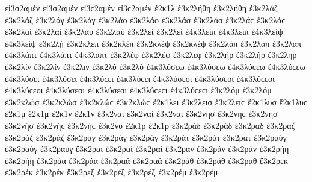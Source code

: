 {εἰ3σ2αμέν εἰ3σ2αμέν εἰ3ϲ2αμέν εἰ3ϲ2αμέν
%
ἐ2κ1λ   %
ἐ3κ2λήθη ἐ3κ2λήθη   %
ἐ3κ2λάζ ἐ3κ2λάζ   %
ἐ3κ2λάγ ἐ3κ2λάγ   %
ἐ3κ2λάο ἐ3κ2λάο   %
ἐ3κ2λάσ ἐ3κ2λάσ ἐ3κ2λάϲ ἐ3κ2λάϲ   %
ἐ3κ2λαί ἐ3κ2λαί   %
ἐ3κ2λαύ ἐ3κ2λαύ   %
ἐ3κ2λεί ἐ3κ2λεί   %
ἐ4κ3λείπ ἐ4κ3λείπ   %
ἐ4κ3λείψ ἐ4κ3λείψ   %
ἐ3κ2λῄ   %
ἐ3κ2κλέπ ἐ3κ2κλέπ   %
ἐ3κ2κλέψ ἐ3κ2κλέψ   %
ἐ3κ2λάπ ἐ3κ2λάπ   %
ἐ3κ2λαπ   %
ἐ4κ3λάπτ ἐ4κ3λάπτ   %
ἐ4κ3λαπτ
ἐ3κ2λέφ ἐ3κ2λέφ   %
ἐ3κ2λεφ   %
ἐ3κ2λήρ ἐ3κ2λήρ   %
ἐ3κ2ληρ   %
ἐ3κ2λίν ἐ3κ2λίν   %
ἐ3κ2λιν   %
ἐ3κ2λύ ἐ3κ2λύ   %
ἐ4κ3λύσεω ἐ4κ3λύσεω ἐ4κ3λύϲεω ἐ4κ3λύϲεω   %
ἐ4κ3λύσει ἐ4κ3λύσει ἐ4κ3λύϲει ἐ4κ3λύϲει
ἐ4κ3λύσεοι ἐ4κ3λύσεοι ἐ4κ3λύϲεοι ἐ4κ3λύϲεοι
ἐ4κ3λύσεσι ἐ4κ3λύσεσι ἐ4κ3λύϲεϲι ἐ4κ3λύϲεϲι
ἐ3κ2λόμ ἐ3κ2λόμ   %
ἐ3κ2κλώσ ἐ3κ2κλώσ ἐ3κ2κλώϲ ἐ3κ2κλώϲ   %
ἔ2κ1λει   %
ἔ3κ2λεισ ἔ3κ2λειϲ   %
ἔ2κ1λυσ ἔ2κ1λυϲ   %
ἐ2κ1μ
ἔ2κ1μ
ἐ2κ1ν
ἔ2κ1ν
ἔ3κ2ναι   %
ἐ3κ2ναί ἐ3κ2ναί   %
ἔ3κ2νησ ἔ3κ2νηϲ   %
ἐ3κ2νήσ ἐ3κ2νήσ ἐ3κ2νήϲ ἐ3κ2νήϲ   %
ἐ3κ2νυ   %
ἐ2κ1ρ
ἔ2κ1ρ
ἐ3κ2ράδ ἐ3κ2ράδ   %
ἐ3κ2ραδ
ἔ3κ2ραζ   %
ἐ3κ2ράζ ἐ3κ2ράζ
ἔ3κ2ραγ   %
ἐ3κ2ράγ ἐ3κ2ράγ
ἐ3κ2ράτ ἐ3κ2ράτ   %
ἐ3κ2ρατ
ἐ3κ2ραύγ ἐ3κ2ραύγ   %
ἐ3κ2ραυγ
ἔ3κ2ραι   %
ἐ3κ2ραί ἐ3κ2ραί
ἔ3κ2ραν   %
ἐ3κ2ράν ἐ3κ2ράν
ἐ3κ2ρήη ἐ3κ2ρήη   %
ἐ3κ2ράα ἐ3κ2ράα
ἐ3κ2ραά ἐ3κ2ραά
ἐ3κ2ράθ ἐ3κ2ράθ   %
ἐ3κ2ραθ
ἔ3κ2ρεκ   %
ἐ3κ2ρέκ ἐ3κ2ρέκ
ἔ3κ2ρεξ   %
ἐ3κ2ρέξ ἐ3κ2ρέξ
ἐ3κ2ρέμ ἐ3κ2ρέμ   %
}
